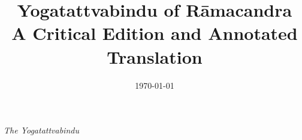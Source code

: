 %




\title{Yogatattvabindu of Rāmacandra\\ A Critical Edition and Annotated Translation}
\date{\today}

\parindent=15pt



\frontmatter
\thispagestyle{empty}
\begin{center}
  {\Large \emph{The Yogatattvabindu}}\\[3mm]
\end{center}



\newpage

\

\thispagestyle{empty}



\normalsize


\newpage


